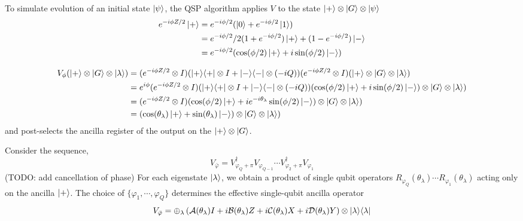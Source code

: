 \documentclass[11pt, oneside]{article}   	%
\begin{document}
To simulate evolution of an initial state $\ket{\psi}$, the QSP algorithm applies $V$ to the state $\ket{+} \otimes \ket{G} \otimes \ket{\psi}$
\begin{align*} 
e^{-i \phi Z/2} \ket{+}
&= e^{-i \phi/2} (\ket{0} + e^{-i \phi/2} \ket{1}) \\
&= e^{-i \phi/2} /2 (1+e^{-i \phi/2}) \ket{+} + (1-e^{-i \phi/2}) \ket{-} \\
&= e^{-i \phi/2}  (\cos(\phi/2) \ket{+} + i \sin(\phi/2) \ket{-})
\end{align*}

\begin{align*} 
V_{\phi} (\ket{+} \otimes \ket{G} \otimes \ket{\lambda})
&= (e^{-i \phi Z/2} \otimes I) (\ket{+} \! \bra{+} \otimes I +  \ket{-} \! \bra{-} \otimes (-iQ)) (e^{-i \phi Z/2} \otimes I) (\ket{+} \otimes \ket{G} \otimes \ket{\lambda}) \\
&= e^{i \phi} (e^{-i \phi Z/2} \otimes I) (\ket{+} \! \bra{+} \otimes I +  \ket{-} \! \bra{-} \otimes (-iQ)) (\cos(\phi/2) \ket{+} + i \sin(\phi/2) \ket{-}) \otimes \ket{G} \otimes \ket{\lambda}) \\
&=  (e^{-i \phi Z/2} \otimes I) (\cos(\phi/2) \ket{+} + ie^{-i \theta_{\lambda}} \sin(\phi/2) \ket{-}) \otimes \ket{G} \otimes \ket{\lambda}) \\
&= (\cos(\theta_{\lambda}) \ket{+} + \sin(\theta_{\lambda}) \ket{-}) \otimes \ket{G} \otimes \ket{\lambda})
\end{align*}
and post-selects the ancilla register of the output on the $\ket{+} \otimes \ket{G}$.

Consider the sequence,
\begin{equation*}
V_{\bar{\varphi}} = V^{\dagger}_{\varphi_Q+\pi} V_{\varphi_{Q-1}} \cdots V^{\dagger}_{\varphi_2+\pi} V_{\varphi_{1}}
\end{equation*}
(TODO: add cancellation of phase)
For each eigenstate $\ket{\lambda}$, we obtain a product of single qubit operators 
$R_{\varphi_Q} (\theta_{\lambda}) \cdots R_{\varphi_1} (\theta_{\lambda})$
acting only on the ancilla $\ket{+}$.
The choice of $\{\varphi_1, \cdots, \varphi_Q \}$ determines the effective single-qubit ancilla operator
\begin{equation*}
V_{\bar{\varphi}} = \oplus_{\lambda} \left( \mathcal{A}(\theta_{\lambda}) I + i \mathcal{B}(\theta_{\lambda}) Z + i \mathcal{C}(\theta_{\lambda}) X + i \mathcal{D}(\theta_{\lambda}) Y \right) \otimes \ket{\lambda} \! \bra{\lambda}
\end{equation*}
\end{document}
